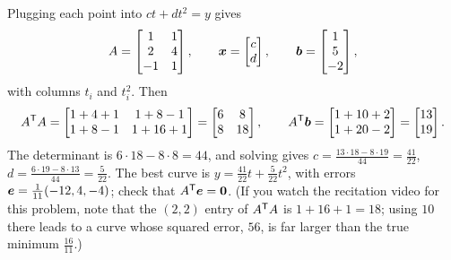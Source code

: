 \begin{solution}
Plugging each point into $ct+dt^2=y$ gives
\[
  A=\begin{bmatrix}1&1\\2&4\\-1&1\end{bmatrix},\qquad
  \boldsymbol{x}=\begin{bmatrix}c\\d\end{bmatrix},\qquad
  \boldsymbol{b}=\begin{bmatrix}1\\5\\-2\end{bmatrix},
\]
with columns $t_i$ and $t_i^2$. Then
\[
  A^{\mathsf{T}} A=\begin{bmatrix}1+4+1&1+8-1\\1+8-1&1+16+1\end{bmatrix}=\begin{bmatrix}6&8\\8&18\end{bmatrix},\qquad
  A^{\mathsf{T}}\boldsymbol{b}=\begin{bmatrix}1+10+2\\1+20-2\end{bmatrix}=\begin{bmatrix}13\\19\end{bmatrix}.
\]
The determinant is $6\cdot 18-8\cdot 8=44$, and solving gives $c=\frac{13\cdot 18-8\cdot 19}{44}=\frac{41}{22}$,
$d=\frac{6\cdot 19-8\cdot 13}{44}=\frac{5}{22}$. The best curve is
$y=\frac{41}{22}t+\frac{5}{22}t^2$, with errors $\boldsymbol{e}=\frac{1}{11}(-12,4,-4)$; check that
$A^{\mathsf{T}}\boldsymbol{e}=\boldsymbol{0}$. (If you watch the recitation video for this problem, note that the
$(2,2)$ entry of $A^{\mathsf{T}} A$ is $1+16+1=18$; using $10$ there leads to a curve whose squared error,
$56$, is far larger than the true minimum $\frac{16}{11}$.)
\end{solution}
